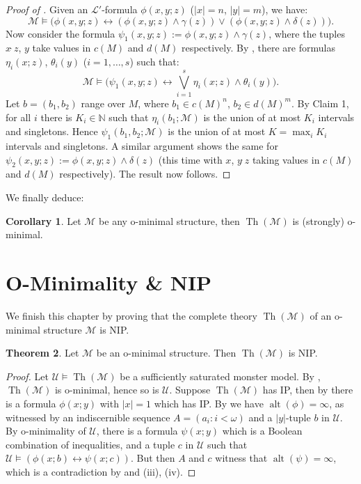 \documentclass[a4paper]{report}
\newcommand{\ind}{\hspace{15pt}}
\newcommand{\tophat}{\hat{\phantom{.}}}
\newcommand{\Nat}{\mathbb{N}}
\renewcommand{\L}{\mathcal{L}}
\newcommand{\M}{\mathcal{M}}
\newcommand{\U}{\mathcal{U}}
\newcommand{\siff}{\leftrightarrow}
\DeclareMathOperator{\Th}{Th}
\DeclareMathOperator{\alt}{alt}
\theoremstyle{definition}
\newtheorem{thm}{Theorem}[chapter]
\newtheorem{cor}[thm]{Corollary}
\theoremstyle{remstyle}
\begin{document}
\begin{proof}[Proof of ]
	Given an $\L'$-formula $\phi(x,y;z)$ ($|x|=n$, $|y|=m$), we have:
	\begin{equation*}
		\M\models\big(\phi(x,y;z) \siff (\phi(x,y;z)\wedge\gamma(z))\vee(\phi(x,y;z)\wedge\delta(z))\big).
	\end{equation*}
	Now consider the formula $\psi_1(x,y;z):=\phi(x,y;z)\wedge\gamma(z)$, where the tuples $x\tophat z$, $y$ take values in $c(M)$ and $d(M)$ respectively. By , there are formulas $\eta_i(x; z)$, $\theta_i(y)$ ($i=1,\ldots,s$) such that:
	\begin{equation*}
		\M\models\bigg(\psi_1(x,y;z) \siff \bigvee_{i=1}^s\eta_i(x; z)\wedge\theta_i(y)\bigg).
	\end{equation*}
	Let $b=(b_1,b_2)$ range over $M$, where $b_1\in c(M)^n$, $b_2\in d(M)^m$. By Claim 1, for all $i$ there is $K_i\in\Nat$ such that $\eta_i(b_1;\M)$ is the union of at most $K_i$ intervals and singletons. Hence $\psi_1(b_1,b_2;\M)$ is the union of at most $K=\max_i K_i$ intervals and singletons. A similar argument shows the same for $\psi_2(x,y;z):=\phi(x,y;z)\wedge\delta(z)$ (this time with $x$, $y\tophat z$ taking values in $c(M)$ and $d(M)$ respectively). The result now follows.
\end{proof}

\ind We finally deduce:

\begin{cor}\label{mixedstrong}
	Let $\M$ be any o-minimal structure, then $\Th(\M)$ is (strongly) o-minimal.
\end{cor}

\section{O-Minimality \& NIP}

\ind We finish this chapter by proving that the complete theory $\Th(\M)$ of an o-minimal structure $\M$ is NIP.

\begin{thm}\label{NIP omin}
	Let $\M$ be an o-minimal structure. Then $\Th(\M)$ is NIP.
\end{thm}

\begin{proof}
	Let $\U\models \Th(\M)$ be a sufficiently saturated monster model. By , $\Th(\M)$ is o-minimal, hence so is $\U$. Suppose $\Th(\M)$ has IP, then by  there is a formula $\phi(x;y)$ with $|x|=1$ which has IP. By  we have $\alt(\phi)=\infty$, as witnessed by an indiscernible sequence $A=(a_i:i<\omega)$ and a $|y|$-tuple $b$ in $\U$. By o-minimality of $\U$, there is a formula $\psi(x;y)$ which is a Boolean combination of inequalities, and a tuple $c$ in $\U$ such that $\U\models(\phi(x;b)\siff\psi(x;c))$. But then $A$ and $c$ witness that $\alt(\psi)=\infty$, which is a contradiction by  and  (iii), (iv).
\end{proof}
\end{document}

